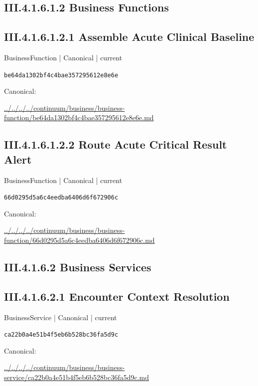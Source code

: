 \documentclass[10pt,a4paper]{article}
\begin{document}
\subsection*{III.4.1.6.1.2 Business Functions}
\subsection*{III.4.1.6.1.2.1 Assemble Acute Clinical Baseline}
\label{element-be64da1302bf4c4bae357295612e8e6e}
{\small BusinessFunction | Canonical | current}\par
\texttt{be64da1302bf4c4bae357295612e8e6e}\par
Canonical: \par
{\footnotesize\url{../../../../continuum/business/business-function/be64da1302bf4c4bae357295612e8e6e.md}}\par
\subsection*{III.4.1.6.1.2.2 Route Acute Critical Result Alert}
\label{element-66d0295d5a6c4eedba6406d6f672906c}
{\small BusinessFunction | Canonical | current}\par
\texttt{66d0295d5a6c4eedba6406d6f672906c}\par
Canonical: \par
{\footnotesize\url{../../../../continuum/business/business-function/66d0295d5a6c4eedba6406d6f672906c.md}}\par
\subsection*{III.4.1.6.2 Business Services}
\subsection*{III.4.1.6.2.1 Encounter Context Resolution}
\label{element-ca22b0a4e51b4f5eb6b528bc36fa5d9c}
{\small BusinessService | Canonical | current}\par
\texttt{ca22b0a4e51b4f5eb6b528bc36fa5d9c}\par
Canonical: \par
{\footnotesize\url{../../../../continuum/business/business-service/ca22b0a4e51b4f5eb6b528bc36fa5d9c.md}}\par
\end{document}
